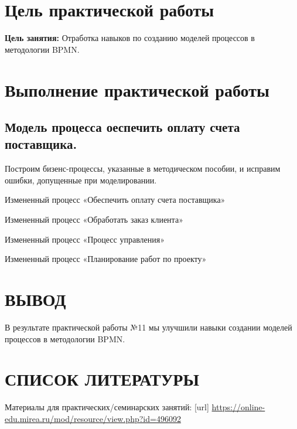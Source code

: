\graphicspath{{./img/}}

\section{Цель практической работы}
\textbf{Цель занятия:}
Отработка навыков по созданию моделей процессов в методологии BPMN.

\clearpage

\section{Выполнение практической работы}
\subsection{Модель процесса оеспечить оплату счета поставщика.}
Построим бизенс-процессы, указанные в методическом пособии, и исправим ошибки, допущенные при моделировании.


\begin{image}
	\caption{Измененный процесс «Обеспечить оплату счета поставщика»}
\end{image}

\clearpage
\newpage

\begin{image}
	\caption{Измененный процесс «Обработать заказ клиента»}
\end{image}


\begin{image}
	\caption{Измененный процесс «Процесс управления»}
\end{image}

\begin{image}
	\caption{Измененный процесс «Планирование работ по проекту»}
\end{image}

\clearpage
\newpage

\section*{ВЫВОД}
В результате практической работы №11 мы улучшили навыки создании моделей процессов в методологии BPMN.

\clearpage

\section*{СПИСОК ЛИТЕРАТУРЫ}
\begin{thebibliography}{}
	\bibitem{}  Материалы для практических/семинарских занятий: [url]
	\url{https://online-edu.mirea.ru/mod/resource/view.php?id=496092}
\end{thebibliography}
